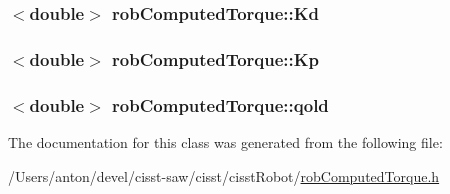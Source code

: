 \subsubsection[{Kd}]{$<$double$>$ rob\+Computed\+Torque\+::\+Kd\hspace{0.3cm}{\ttfamily [protected]}}\label{classrob_computed_torque_acb199d8b884ccc02c1d47900c587eb79}
\hypertarget{classrob_computed_torque_a11a6fdb06f86a2b81402c1c872c23484}{}
\subsubsection[{Kp}]{$<$double$>$ rob\+Computed\+Torque\+::\+Kp\hspace{0.3cm}{\ttfamily [protected]}}\label{classrob_computed_torque_a11a6fdb06f86a2b81402c1c872c23484}
\hypertarget{classrob_computed_torque_ad528baead484f2d409ac574a83300e1a}{}
\subsubsection[{qold}]{$<$double$>$ rob\+Computed\+Torque\+::qold\hspace{0.3cm}{\ttfamily [protected]}}\label{classrob_computed_torque_ad528baead484f2d409ac574a83300e1a}


The documentation for this class was generated from the following file\+:\begin{DoxyCompactItemize}
\item 
/\+Users/anton/devel/cisst-\/saw/cisst/cisst\+Robot/\hyperlink{rob_computed_torque_8h}{rob\+Computed\+Torque.\+h}\end{DoxyCompactItemize}
